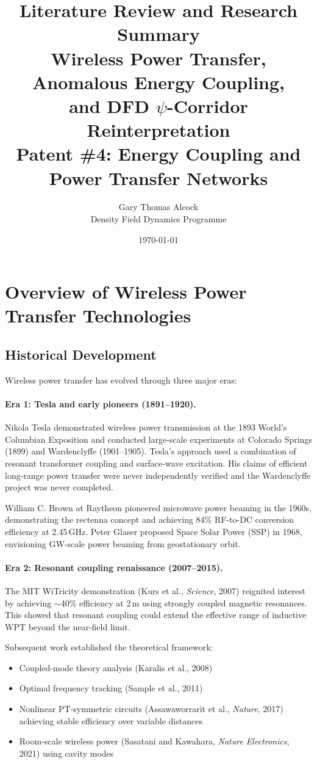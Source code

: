 \documentclass[11pt,a4paper]{article}
\title{\textbf{Literature Review and Research Summary}\\[0.5em]
\Large Wireless Power Transfer, Anomalous Energy Coupling,\\
and DFD $\psi$-Corridor Reinterpretation\\[0.3em]
\normalsize Patent \#4: Energy Coupling and Power Transfer Networks}
\author{Gary Thomas Alcock\\
Density Field Dynamics Programme}
\date{\today}
\begin{document}
\maketitle
\tableofcontents
\newpage

\section{Overview of Wireless Power Transfer Technologies}

\subsection{Historical Development}

Wireless power transfer has evolved through three major eras:

\paragraph{Era 1: Tesla and early pioneers (1891--1920).}
Nikola Tesla demonstrated wireless power transmission at the 1893
World's Columbian Exposition and conducted large-scale experiments at
Colorado Springs (1899) and Wardenclyffe (1901--1905). Tesla's approach
used a combination of resonant transformer coupling and surface-wave
excitation. His claims of efficient long-range power transfer were
never independently verified and the Wardenclyffe project was never
completed.

William C. Brown at Raytheon pioneered microwave power beaming in
the 1960s, demonstrating the rectenna concept and achieving 84\%
RF-to-DC conversion efficiency at 2.45\,GHz. Peter Glaser proposed
Space Solar Power (SSP) in 1968, envisioning GW-scale power
beaming from geostationary orbit.

\paragraph{Era 2: Resonant coupling renaissance (2007--2015).}
The MIT WiTricity demonstration (Kurs et al., \textit{Science}, 2007)
reignited interest by achieving $\sim$40\% efficiency at 2\,m using
strongly coupled magnetic resonances. This showed that resonant
coupling could extend the effective range of inductive WPT beyond
the near-field limit.

Subsequent work established the theoretical framework:
\begin{itemize}
\item Coupled-mode theory analysis (Karalis et al., 2008)
\item Optimal frequency tracking (Sample et al., 2011)
\item Nonlinear PT-symmetric circuits (Assawaworrarit et al.,
\textit{Nature}, 2017) achieving stable efficiency over variable distances
\item Room-scale wireless power (Sasatani and Kawahara,
\textit{Nature Electronics}, 2021) using cavity modes
\end{itemize}
\end{document}
